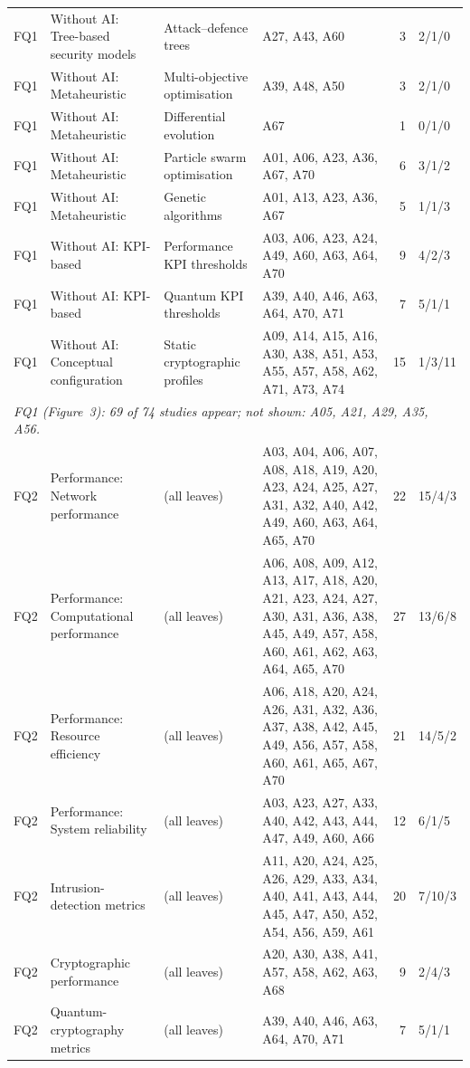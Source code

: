 {\begin{footnotesize}
\begin{longtable}{p{0.63cm}p{2.83cm}p{2.67cm}p{5.19cm}rp{1.26cm}}
FQ1 & Without AI: Tree-based security models & Attack--defence trees & A27, A43, A60 & 3 & 2/1/0 \\
FQ1 & Without AI: Metaheuristic & Multi-objective optimisation & A39, A48, A50 & 3 & 2/1/0 \\
FQ1 & Without AI: Metaheuristic & Differential evolution & A67 & 1 & 0/1/0 \\
FQ1 & Without AI: Metaheuristic & Particle swarm optimisation & A01, A06, A23, A36, A67, A70 & 6 & 3/1/2 \\
FQ1 & Without AI: Metaheuristic & Genetic algorithms & A01, A13, A23, A36, A67 & 5 & 1/1/3 \\
FQ1 & Without AI: KPI-based & Performance KPI thresholds & A03, A06, A23, A24, A49, A60, A63, A64, A70 & 9 & 4/2/3 \\
FQ1 & Without AI: KPI-based & Quantum KPI thresholds & A39, A40, A46, A63, A64, A70, A71 & 7 & 5/1/1 \\
FQ1 & Without AI: Conceptual configuration & Static cryptographic profiles & A09, A14, A15, A16, A30, A38, A51, A53, A55, A57, A58, A62, A71, A73, A74 & 15 & 1/3/11 \\
\multicolumn{6}{p{14.2cm}}{\emph{FQ1 (Figure~3): 69 of 74 studies appear; not shown: A05, A21, A29, A35, A56.}}\\ \hline
FQ2 & Performance: Network performance & (all leaves) & A03, A04, A06, A07, A08, A18, A19, A20, A23, A24, A25, A27, A31, A32, A40, A42, A49, A60, A63, A64, A65, A70 & 22 & 15/4/3 \\
FQ2 & Performance: Computational performance & (all leaves) & A06, A08, A09, A12, A13, A17, A18, A20, A21, A23, A24, A27, A30, A31, A36, A38, A45, A49, A57, A58, A60, A61, A62, A63, A64, A65, A70 & 27 & 13/6/8 \\
FQ2 & Performance: Resource efficiency & (all leaves) & A06, A18, A20, A24, A26, A31, A32, A36, A37, A38, A42, A45, A49, A56, A57, A58, A60, A61, A65, A67, A70 & 21 & 14/5/2 \\
FQ2 & Performance: System reliability & (all leaves) & A03, A23, A27, A33, A40, A42, A43, A44, A47, A49, A60, A66 & 12 & 6/1/5 \\
FQ2 & Intrusion-detection metrics & (all leaves) & A11, A20, A24, A25, A26, A29, A33, A34, A40, A41, A43, A44, A45, A47, A50, A52, A54, A56, A59, A61 & 20 & 7/10/3 \\
FQ2 & Cryptographic performance & (all leaves) & A20, A30, A38, A41, A57, A58, A62, A63, A68 & 9 & 2/4/3 \\
FQ2 & Quantum-cryptography metrics & (all leaves) & A39, A40, A46, A63, A64, A70, A71 & 7 & 5/1/1 \\

\end{longtable}
\end{footnotesize}}
